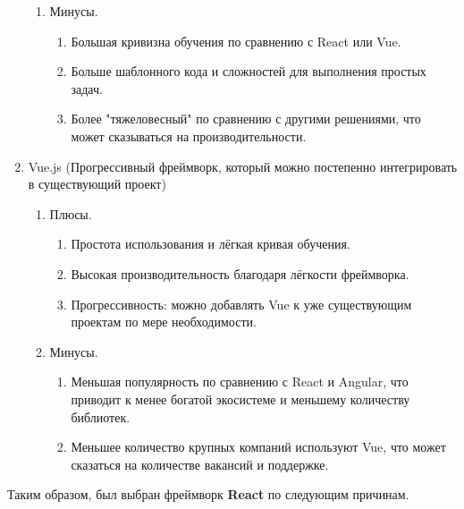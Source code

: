 \begin{enumerate}
\begin{enumerate}
		\item Минусы.
		\begin{enumerate}
			\item Большая кривизна обучения по сравнению с React или Vue.
			\item Больше шаблонного кода и сложностей для выполнения простых задач.
			\item Более "тяжеловесный" по сравнению с другими решениями, что может сказываться на производительности.
		\end{enumerate}
	\end{enumerate}

	\item Vue.js (Прогрессивный фреймворк, который можно постепенно интегрировать в существующий проект)
	\begin{enumerate}
		\item Плюсы.
		\begin{enumerate}
			\item Простота использования и лёгкая кривая обучения.
			\item Высокая производительность благодаря лёгкости фреймворка.
			\item Прогрессивность: можно добавлять Vue к уже существующим проектам по мере необходимости.
		\end{enumerate}

		\item Минусы.
		\begin{enumerate}
			\item Меньшая популярность по сравнению с React и Angular, что приводит к менее богатой экосистеме и меньшему количеству библиотек.
			\item Меньшее количество крупных компаний используют Vue, что может сказаться на количестве вакансий и поддержке.
		\end{enumerate}
	\end{enumerate}
\end{enumerate}

Таким образом, был выбран фреймворк \textbf{React} \cite{react} по следующим причинам.

